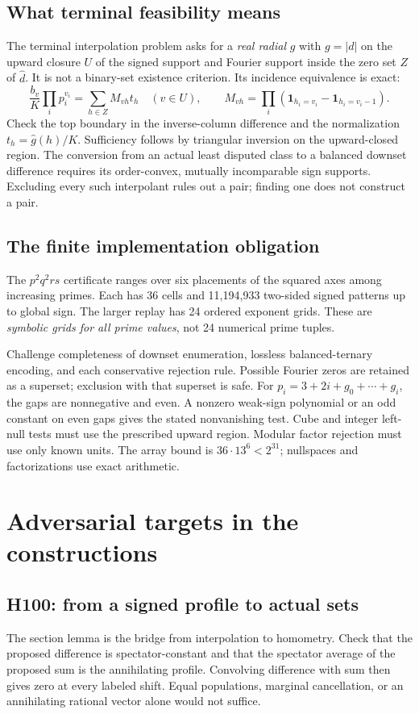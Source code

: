 \documentclass[10pt]{article}
\newcommand{\ind}{\mathbf1}
\begin{document}
\subsection{What terminal feasibility means}
The terminal interpolation problem asks for a \emph{real radial} $g$ with
$g=|d|$ on the upward closure $U$ of the signed support and Fourier
support inside the zero set $Z$ of $\widehat d$. It is not a binary-set
existence criterion. Its incidence equivalence is exact:
\[
 \frac{b_v}{K}\prod_i p_i^{v_i}
    =\sum_{h\in Z}M_{vh}t_h\quad(v\in U),\qquad
 M_{vh}=\prod_i(\ind_{h_i=v_i}-\ind_{h_i=v_i-1}).
\]
Check the top boundary in the inverse-column difference and the
normalization $t_h=\widehat g(h)/K$. Sufficiency follows by triangular
inversion on the upward-closed region. The conversion from an actual
least disputed class to a balanced downset difference requires its
order-convex, mutually incomparable sign supports. Excluding every such
interpolant rules out a pair; finding one does not construct a pair.

\subsection{The finite implementation obligation}
The $p^2q^2rs$ certificate ranges over six placements of the squared axes
among increasing primes. Each has 36 cells and 11,194,933 two-sided
signed patterns up to global sign. The larger replay has 24 ordered
exponent grids. These are \emph{symbolic grids for all prime values}, not
24 numerical prime tuples.

Challenge completeness of downset enumeration, lossless balanced-ternary
encoding, and each conservative rejection rule. Possible Fourier zeros
are retained as a superset; exclusion with that superset is safe. For
$p_i=3+2i+g_0+\cdots+g_i$, the gaps are nonnegative and even. A nonzero
weak-sign polynomial or an odd constant on even gaps gives the stated
nonvanishing test. Cube and integer left-null tests must use the
prescribed upward region. Modular factor rejection must use only known
units. The array bound is $36\cdot13^6<2^{31}$; nullspaces and
factorizations use exact arithmetic.

\newpage
\section{Adversarial targets in the constructions}

\subsection{H100: from a signed profile to actual sets}
The section lemma is the bridge from interpolation to homometry. Check
that the proposed difference is spectator-constant and that the
spectator average of the proposed sum is the annihilating profile.
Convolving difference with sum then gives zero at every labeled shift.
Equal populations, marginal cancellation, or an annihilating rational
vector alone would not suffice.
\end{document}
